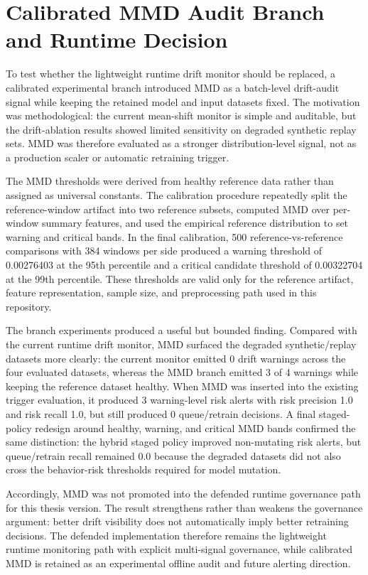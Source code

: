 \section{Calibrated MMD Audit Branch and Runtime Decision}
\label{sec:mmd_audit_runtime_decision}

To test whether the lightweight runtime drift monitor should be replaced, a calibrated experimental branch introduced MMD as a batch-level drift-audit signal while keeping the retained model and input datasets fixed. The motivation was methodological: the current mean-shift monitor is simple and auditable, but the drift-ablation results showed limited sensitivity on degraded synthetic replay sets. MMD was therefore evaluated as a stronger distribution-level signal, not as a production scaler or automatic retraining trigger.

The MMD thresholds were derived from healthy reference data rather than assigned as universal constants. The calibration procedure repeatedly split the reference-window artifact into two reference subsets, computed MMD over per-window summary features, and used the empirical reference distribution to set warning and critical bands. In the final calibration, 500 reference-vs-reference comparisons with 384 windows per side produced a warning threshold of 0.00276403 at the 95th percentile and a critical candidate threshold of 0.00322704 at the 99th percentile. These thresholds are valid only for the reference artifact, feature representation, sample size, and preprocessing path used in this repository.

The branch experiments produced a useful but bounded finding. Compared with the current runtime drift monitor, MMD surfaced the degraded synthetic/replay datasets more clearly: the current monitor emitted 0 drift warnings across the four evaluated datasets, whereas the MMD branch emitted 3 of 4 warnings while keeping the reference dataset healthy. When MMD was inserted into the existing trigger evaluation, it produced 3 warning-level risk alerts with risk precision 1.0 and risk recall 1.0, but still produced 0 queue/retrain decisions. A final staged-policy redesign around healthy, warning, and critical MMD bands confirmed the same distinction: the hybrid staged policy improved non-mutating risk alerts, but queue/retrain recall remained 0.0 because the degraded datasets did not also cross the behavior-risk thresholds required for model mutation.

Accordingly, MMD was not promoted into the defended runtime governance path for this thesis version. The result strengthens rather than weakens the governance argument: better drift visibility does not automatically imply better retraining decisions. The defended implementation therefore remains the lightweight runtime monitoring path with explicit multi-signal governance, while calibrated MMD is retained as an experimental offline audit and future alerting direction.

